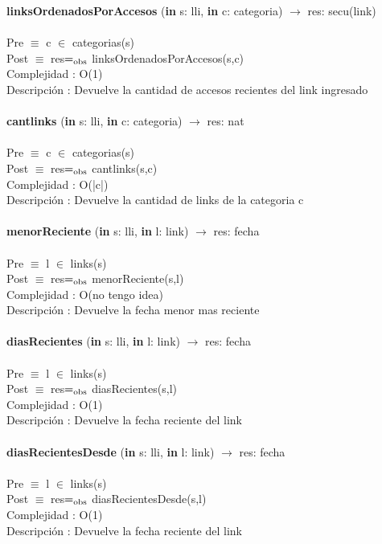\documentclass[10pt, a4paper]{article}
\begin{document}
	\textbf{linksOrdenadosPorAccesos} (\textbf{in} s: lli, \textbf{in} c: categoria) $\longrightarrow$ res: secu(link)\\\\
	Pre $\equiv$ {c $\in$ categorias(s)}\\
	Post $\equiv$ {res$=_{\mathrm{obs}}$ linksOrdenadosPorAccesos(s,c)}\\
	Complejidad : O(1)\\
	Descripci\'{o}n : Devuelve la cantidad de accesos recientes del link ingresado\\\\
	
	\textbf{cantlinks} (\textbf{in} s: lli, \textbf{in} c: categoria) $\longrightarrow$ res: nat\\\\
	Pre $\equiv$ {c $\in$ categorias(s)}\\
	Post $\equiv$ {res$=_{\mathrm{obs}}$ cantlinks(s,c)}\\
	Complejidad : O(|c|)\\
	Descripci\'{o}n : Devuelve la cantidad de links de la categoria c\\\\
	
	\textbf{menorReciente} (\textbf{in} s: lli, \textbf{in} l: link) $\longrightarrow$ res: fecha\\\\
	Pre $\equiv$ {l $\in$ links(s)}\\
	Post $\equiv$ {res$=_{\mathrm{obs}}$ menorReciente(s,l)}\\
	Complejidad : O(no tengo idea)\\
	Descripci\'{o}n : Devuelve la fecha menor mas reciente\\\\
	
	\textbf{diasRecientes} (\textbf{in} s: lli, \textbf{in} l: link) $\longrightarrow$ res: fecha\\\\
	Pre $\equiv$ {l $\in$ links(s)}\\
	Post $\equiv$ {res$=_{\mathrm{obs}}$ diasRecientes(s,l)}\\
	Complejidad : O(1)\\
	Descripci\'{o}n : Devuelve la fecha reciente del link\\\\
	
	\textbf{diasRecientesDesde} (\textbf{in} s: lli, \textbf{in} l: link) $\longrightarrow$ res: fecha\\\\
	Pre $\equiv$ {l $\in$ links(s)}\\
	Post $\equiv$ {res$=_{\mathrm{obs}}$ diasRecientesDesde(s,l)}\\
	Complejidad : O(1)\\
	Descripci\'{o}n : Devuelve la fecha reciente del link\\\\
	
\end{document}
